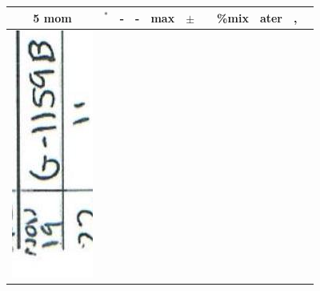 \documentclass[10pt]{article}
\begin{document}
\begin{center}
\begin{tabular}{|c|c|c|c|c|c|c|c|c|c|c|}
\hline
5 mom & \({ }^{*}\) & - & - & max & \(\pm\) &  & \%mix & ater & , &  \\
\hline
\includegraphics[max width=\textwidth]{2025_02_27_dd68c3d38de88f0516d9g-082(4)}

\end{tabular}
\end{center}
\end{document}
